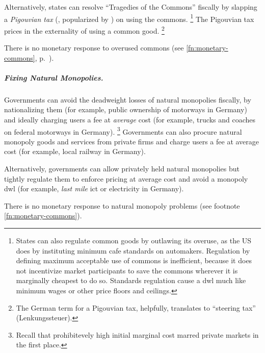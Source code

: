 Alternatively, states can resolve ``Tragedies of the Commons'' \citep{Hardin-1968-aa} fiscally by slapping a \emph{Pigouvian tax} (\citealt{Pigou1912}, popularized by \citealt{Baumol1972}) on using the commons.
\footnote{
	States can also regulate common goods by outlawing its overuse, as the US does by instituting minimum \gls{cafe} standards on automakers.
	Regulation by defining maximum acceptable use of commons is inefficient, because it does not incentivize market participants to save the commons wherever it is marginally cheapest to do so.
	Standards regulation cause a \gls{dwl} much like minimum wages or other price floors and ceilings.
}
The Pigouvian tax prices in the externality of using a common good.
\footnote{
	The German term for a Pigouvian tax, helpfully, translates to ``steering tax'' (Lenkungssteuer).
}

There is no monetary response to overused commons (see \autoref{fn:monetary-commons}, p.~\pageref{fn:monetary-commons}).

\subparagraph{Fixing Natural Monopolies.}
	\label{sec:natural-monopoly-response}
Governments can avoid the deadweight losses of natural monopolies fiscally, by nationalizing them (for example, public ownership of motorways in Germany) and ideally charging users a fee at \emph{average} cost (for example, trucks and coaches on federal motorways in Germany).
\footnote{
	\label{fn:why-ac-fees}
	Recall that prohibitevely high initial marginal cost marred private markets in the first place.
}
Governments can also procure natural monopoly goods and services from private firms and charge users a fee at average cost (for example, local railway in Germany).


Alternatively, governments can allow privately held natural monopolies but tightly regulate them to enforce pricing at average cost and avoid a monopoly \gls{dwl} (for example, \emph{last mile} \gls{ict} or electricity in Germany).

There is no monetary response to natural monopoly problems (see footnote \ref{fn:monetary-commons}).


